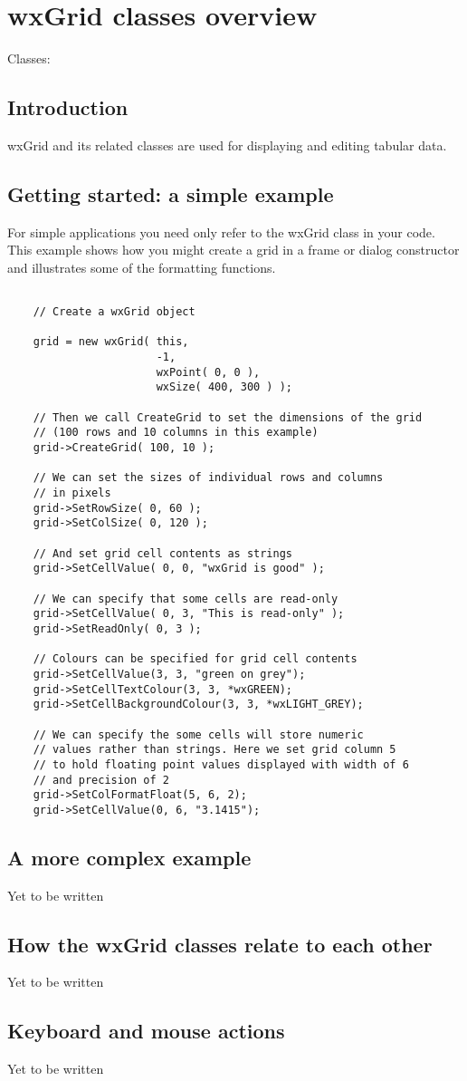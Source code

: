 \section{wxGrid classes overview}\label{gridoverview}

Classes: 

\subsection{Introduction}
wxGrid and its related classes are used for displaying and editing tabular data.

\subsection{Getting started: a simple example}
For simple applications you need only refer to the wxGrid class in your
code.  This example shows how you might create a grid in a frame or
dialog constructor and illustrates some of the formatting functions. 

\begin{verbatim}

    // Create a wxGrid object
    
    grid = new wxGrid( this,
                       -1,
                       wxPoint( 0, 0 ),
                       wxSize( 400, 300 ) );

    // Then we call CreateGrid to set the dimensions of the grid
    // (100 rows and 10 columns in this example)
    grid->CreateGrid( 100, 10 );

    // We can set the sizes of individual rows and columns
    // in pixels
    grid->SetRowSize( 0, 60 );
    grid->SetColSize( 0, 120 );
    
    // And set grid cell contents as strings
    grid->SetCellValue( 0, 0, "wxGrid is good" );

    // We can specify that some cells are read-only
    grid->SetCellValue( 0, 3, "This is read-only" );
    grid->SetReadOnly( 0, 3 );

    // Colours can be specified for grid cell contents
    grid->SetCellValue(3, 3, "green on grey");
    grid->SetCellTextColour(3, 3, *wxGREEN);
    grid->SetCellBackgroundColour(3, 3, *wxLIGHT_GREY);

    // We can specify the some cells will store numeric 
    // values rather than strings. Here we set grid column 5 
    // to hold floating point values displayed with width of 6 
    // and precision of 2
    grid->SetColFormatFloat(5, 6, 2);
    grid->SetCellValue(0, 6, "3.1415");

\end{verbatim}

\subsection{A more complex example}
Yet to be written

\subsection{How the wxGrid classes relate to each other}
Yet to be written

\subsection{Keyboard and mouse actions}
Yet to be written

